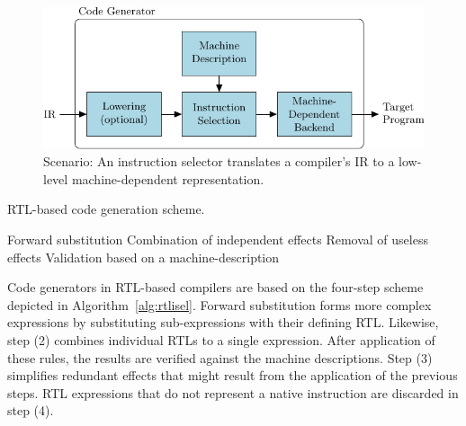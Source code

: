 \begin{figure}[t]
  \begin{center}



    \includegraphics{fig/pgf-fig001}
  \end{center}
  \caption{Scenario: An instruction selector translates a compiler's IR to a
    low-level machine-dependent representation.}
  \label{fig:instruction-selection}
\end{figure}


\begin{algorithm}
\caption{RTL-based code generation scheme.}
\label{alg:rtlisel}
\begin{algorithmic}[1]
\STATE Forward substitution
\STATE Combination of independent effects
\STATE Removal of useless effects
\STATE Validation based on a machine-description
\end{algorithmic}
\end{algorithm}
Code generators in RTL-based compilers are based on the four-step
scheme depicted in Algorithm~\ref{alg:rtlisel}. Forward substitution
forms more complex expressions by substituting sub-expressions with
their defining RTL. Likewise, step (2) combines individual RTLs to a
single expression. After application of these rules, the results are
verified against the machine descriptions. Step (3) simplifies
redundant effects that might result from the application of the
previous steps. RTL expressions that do not represent a native
instruction are discarded in step (4).

